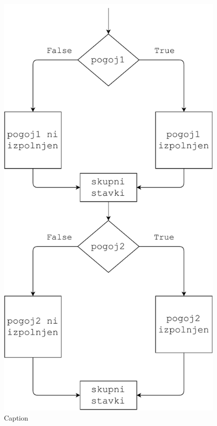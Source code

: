 \begin{figure}
    \centering
    \includegraphics[width=0.5\linewidth]{img/if4.pdf}
    \caption{Caption}
    \label{img:if4}
\end{figure}